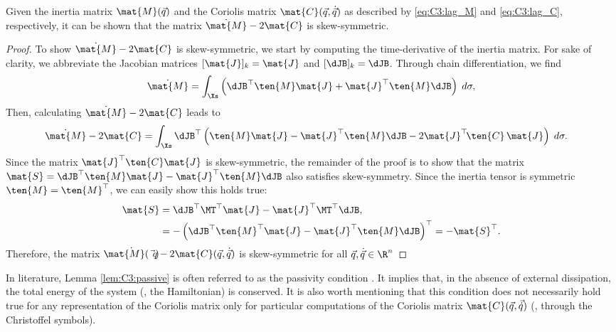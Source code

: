 \begin{lem}
\label{lem:C3:passive}
Given the inertia matrix $\mat{M}(\vec{q})$ and the Coriolis matrix
$\mat{C}(\vec{q},\dot{\vec{q}})$ as described by \eqref{eq:C3:lag_M} and \eqref{eq:C3:lag_C}, respectively, it can be shown that the matrix $\dot{\mat{M}} - 2\mat{C}$ is skew-symmetric.
\end{lem}

\begin{proof}
To show $\dot{\mat{M}} - 2\mat{C}$ is skew-symmetric, we start by computing the time-derivative of the inertia matrix. For sake of clarity, we abbreviate the Jacobian matrices $[\mat{J}]_k = \mat{J}$ and $[\dJB]_k = \dJB$. Through chain differentiation, we find
%
\begin{equation}
\dot{\mat{M}} = \int_\Xs \left(\dJB^\top \ten{M} \mat{J} + \mat{J}^\top \ten{M} \dJB 
\right)\; d \sigma,
\end{equation}
%
Then, calculating $\dot{\mat{M}} - 2\mat{C}$ leads to
%
\begin{align}
\dot{\mat{M}} - 2\mat{C} & = \int_\Xs \dJB^\top \left( \ten{M} \mat{J} - \mat{J}^\top \ten{M} \dJB - 2\mat{J}^\top \!\ten{C} \, \mat{J} \right) \; d\sigma.
\end{align}
%
Since the matrix $\mat{J}^\top \ten{C} \mat{J}$ is skew-symmetric, the remainder of the proof is to show that the matrix $\mat{S} = \dJB^\top \ten{M} \mat{J} - \mat{J}^\top \ten{M} \dJB$ also satisfies skew-symmetry. Since the inertia tensor is symmetric $\ten{M} = \ten{M}^\top
$, we can easily show this holds true:
%
\begin{align}
\mat{S} & = \dJB^\top \MT^\top \mat{J} - \mat{J}^\top \MT^\top \dJB, \notag \\
 & = -\left(\dJB^\top \ten{M}^\top \mat{J} - \mat{J}^\top \ten{M} \dJB \right)^\top = -\mat{S}^\top.
\end{align}
%
Therefore, the matrix $\dot{\mat{M}(\vec{q})} - 2\mat{C}(\vec{q},\dot{\vec{q}})$ is skew-symmetric for all $\vec{q},\dot{\vec{q}} \in \R^n$
\end{proof}

In literature, Lemma \ref{lem:C3:passive} is often referred to as the passivity condition \cite{Spong2006,Ortega1998,Murray1994}. It implies that, in the absence of external dissipation, the total energy of the system (\ie, the Hamiltonian) is conserved.
It is also worth mentioning that this condition does not necessarily hold true for any representation of the Coriolis matrix only for particular computations of the Coriolis matrix $\mat{C}(\vec{q},\vec{\dot{q}})$ (\eg, through the Christoffel symbols).

